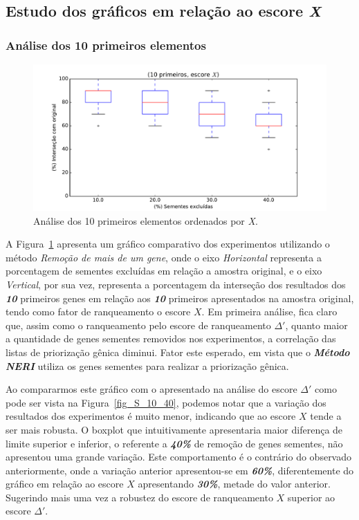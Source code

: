 %
%
%
%
%
\subsection{Estudo dos gráficos em relação ao escore \textit{X}}
\subsubsection{Análise dos 10 primeiros elementos}
%
\begin{figure}[ht!]
\centering
\includegraphics[width=\textwidth]{Images/analyses/fig_X_10_40.pdf}
\caption {Análise dos 10 primeiros elementos ordenados por \textit{X}.
\label{fig_X_10_40}}
\end{figure}
%
%

%
A Figura~\ref{fig_X_10_40} apresenta um gráfico comparativo dos experimentos utilizando o método \textit{Remoção de mais de um gene}, onde o eixo \textsl{Horizontal} representa a porcentagem de sementes excluídas em relação a amostra original, e o eixo \textsl{Vertical}, por sua vez, representa a porcentagem da interseção dos resultados dos \textsl{\textbf{10}} primeiros genes em relação aos \textsl{\textbf{10}} primeiros apresentados na amostra original, tendo como fator de ranqueamento o escore $X$.
%
Em primeira análise, fica claro que, assim como o ranqueamento pelo escore de ranqueamento $\Delta'$, quanto maior a quantidade de genes sementes removidos nos experimentos, a correlação das listas de priorização gênica diminui. Fator este esperado, em vista que o \textbf{\textsl{Método NERI}} utiliza os genes sementes para realizar a priorização gênica.
%

Ao compararmos este gráfico com o apresentado na análise do escore $\Delta'$ como pode ser vista na Figura~\ref{fig_S_10_40}, podemos notar que a variação dos resultados dos experimentos é muito menor, indicando que ao escore \textbf{$X$} tende a ser mais robusta. O boxplot que intuitivamente apresentaria maior diferença de limite superior e inferior, o referente a \textbf{\textsl{40\%}} de remoção de genes sementes, não apresentou uma grande variação. Este comportamento é o contrário do observado anteriormente, onde a variação anterior apresentou-se em \textbf{\textsl{60\%}}, diferentemente do gráfico em relação ao escore \textbf{$X$} apresentando \textbf{\textsl{30\%}}, metade do valor anterior. Sugerindo mais uma vez a robustez do escore de ranqueamento $X$ superior ao escore $\Delta'$.

